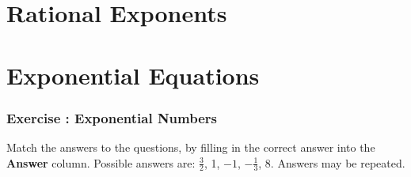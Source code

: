 \section{Rational Exponents}
\section{Exponential Equations}
            \subsubsection{  Exercise : Exponential Numbers }
            \nopagebreak
        \label{m38359*id67549}Match the answers to the questions, by filling in the correct answer into the \textbf{Answer} column.
Possible answers are: $\frac{3}{2}$, 1, $-1$, $-\frac{1}{3}$, 8. Answers may be repeated.\par 

